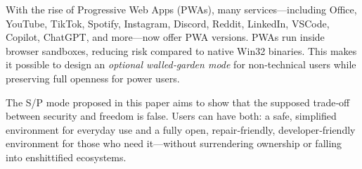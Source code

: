 With the rise of Progressive Web Apps (PWAs)\cite{8399228, webDevPWA}, many services—including Office, YouTube, TikTok, Spotify, Instagram, Discord, Reddit, LinkedIn, VSCode, Copilot, ChatGPT, and more—now offer PWA versions. PWAs run inside browser sandboxes, reducing risk compared to native Win32 binaries. This makes it possible to design an \textit{optional walled‑garden mode} for non‑technical users while preserving full openness for power users.

The S/P mode proposed in this paper aims to show that the supposed trade‑off between security and freedom is false. Users can have both: a safe, simplified environment for everyday use and a fully open, repair‑friendly, developer‑friendly environment for those who need it—without surrendering ownership or falling into enshittified ecosystems.
